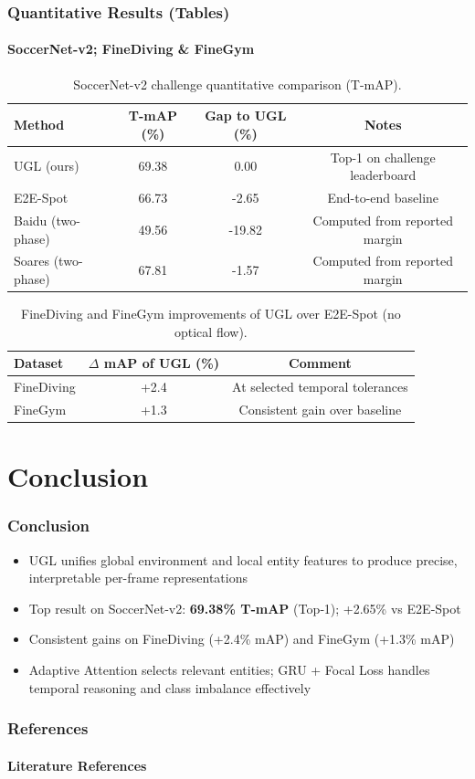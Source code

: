 \documentclass[aspectratio=169, lecture, amberg]{OTHAWbeamer}
\begin{document}
\begin{frame}
\frametitle{Quantitative Results (Tables)}
\framesubtitle{SoccerNet-v2; FineDiving \& FineGym}

\begin{table}[ht]
\centering
\caption{SoccerNet-v2 challenge quantitative comparison (T-mAP).}
\label{tab:soccernet_results}
\begin{tabular}{lccc}
\hline
Method & T-mAP (\%) & Gap to UGL (\%) & Notes \\
\hline
UGL (ours) & 69.38 & 0.00 & Top-1 on challenge leaderboard \\
E2E-Spot & 66.73 & -2.65 & End-to-end baseline \\
Baidu (two-phase) & 49.56 & -19.82 & Computed from reported margin \\
Soares (two-phase) & 67.81 & -1.57 & Computed from reported margin \\
\hline
\end{tabular}
\end{table}

\vspace{0.4cm}

\begin{table}[ht]
\centering
\caption{FineDiving and FineGym improvements of UGL over E2E-Spot (no optical flow).}
\label{tab:finediving_finegym_results}
\begin{tabular}{lcc}
\hline
Dataset & $\Delta$ mAP of UGL (\%) & Comment \\
\hline
FineDiving & +2.4 & At selected temporal tolerances \\
FineGym & +1.3 & Consistent gain over baseline \\
\hline
\end{tabular}
\end{table}

\end{frame}

\section{Conclusion}

\begin{frame}
\frametitle{Conclusion}
\begin{itemize}
	\item UGL unifies global environment and local entity features to produce precise, interpretable per-frame representations
	\item Top result on SoccerNet‑v2: \textbf{69.38\% T‑mAP} (Top‑1); +2.65\% vs E2E‑Spot
	\item Consistent gains on FineDiving (+2.4\% mAP) and FineGym (+1.3\% mAP)
	\item Adaptive Attention selects relevant entities; GRU + Focal Loss handles temporal reasoning and class imbalance effectively
\end{itemize}
\end{frame}

\begin{frame}[allowframebreaks]
\frametitle{References}
\framesubtitle{Literature References}
\printbibliography%
\end{frame}
\end{document}
